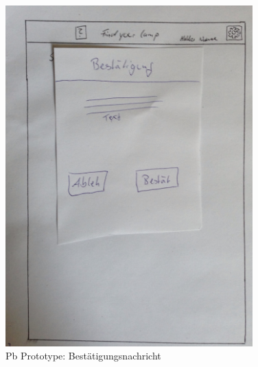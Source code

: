 \begin{figure}[H]
\centering
\includegraphics[angle=90, width=0.85\textwidth]{./images/paperbased/bestaetigung.JPG}
\caption{Pb Prototype: Bestätigungsnachricht}
\label{pbprototype6}
\end{figure}

